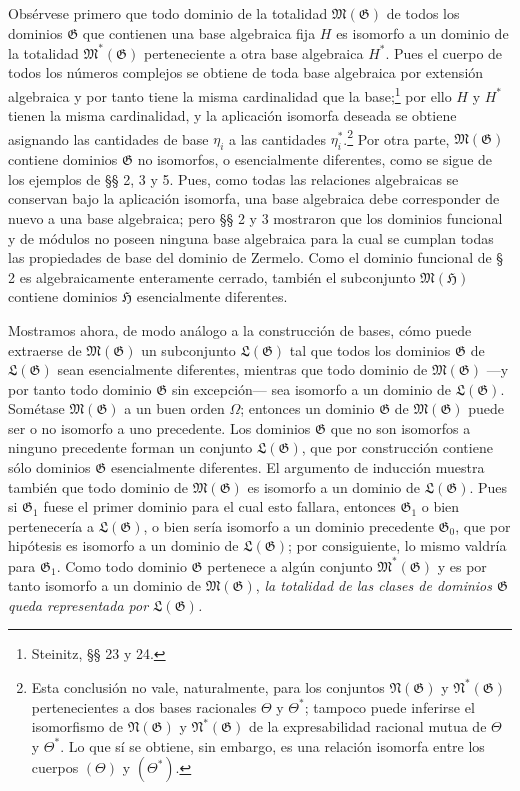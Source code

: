 Obsérvese primero que todo dominio de la totalidad $\mathfrak M(\mathfrak G)$ de todos los dominios $\mathfrak G$ que contienen una base algebraica fija $H$ es isomorfo a un dominio de la totalidad $\mathfrak M^*(\mathfrak G)$ perteneciente a otra base algebraica $H^*$. Pues el cuerpo de todos los números complejos se obtiene de toda base algebraica por extensión algebraica y por tanto tiene la misma cardinalidad que la base;\footnote{Steinitz, §§ 23 y 24.} por ello $H$ y $H^*$ tienen la misma cardinalidad, y la aplicación isomorfa deseada se obtiene asignando las cantidades de base $\eta_i$ a las cantidades $\eta_i^*$.\footnote{Esta conclusión no vale, naturalmente, para los conjuntos $\mathfrak N(\mathfrak G)$ y $\mathfrak N^*(\mathfrak G)$ pertenecientes a dos bases racionales $\Theta$ y $\Theta^*$; tampoco puede inferirse el isomorfismo de $\mathfrak N(\mathfrak G)$ y $\mathfrak N^*(\mathfrak G)$ de la expresabilidad racional mutua de $\Theta$ y $\Theta^*$. Lo que sí se obtiene, sin embargo, es una relación isomorfa entre los cuerpos $(\Theta)$ y $(\Theta^*)$.} Por otra parte, $\mathfrak M(\mathfrak G)$ contiene dominios $\mathfrak G$ no isomorfos, o esencialmente diferentes, como se sigue de los ejemplos de §§ 2, 3 y 5. Pues, como todas las relaciones algebraicas se conservan bajo la aplicación isomorfa, una base algebraica debe corresponder de nuevo a una base algebraica; pero §§ 2 y 3 mostraron que los dominios funcional y de módulos no poseen ninguna base algebraica para la cual se cumplan todas las propiedades de base del dominio de Zermelo. Como el dominio funcional de § 2 es algebraicamente enteramente cerrado, también el subconjunto $\mathfrak M(\mathfrak H)$ contiene dominios $\mathfrak H$ esencialmente diferentes.

Mostramos ahora, de modo análogo a la construcción de bases, cómo puede extraerse de $\mathfrak M(\mathfrak G)$ un subconjunto $\mathfrak L(\mathfrak G)$ tal que todos los dominios $\mathfrak G$ de $\mathfrak L(\mathfrak G)$ sean esencialmente diferentes, mientras que todo dominio de $\mathfrak M(\mathfrak G)$ ---y por tanto todo dominio $\mathfrak G$ sin excepción--- sea isomorfo a un dominio de $\mathfrak L(\mathfrak G)$. Sométase $\mathfrak M(\mathfrak G)$ a un buen orden $\Omega$; entonces un dominio $\mathfrak G$ de $\mathfrak M(\mathfrak G)$ puede ser o no isomorfo a uno precedente. Los dominios $\mathfrak G$ que no son isomorfos a ninguno precedente forman un conjunto $\mathfrak L(\mathfrak G)$, que por construcción contiene sólo dominios $\mathfrak G$ esencialmente diferentes. El argumento de inducción muestra también que todo dominio de $\mathfrak M(\mathfrak G)$ es isomorfo a un dominio de $\mathfrak L(\mathfrak G)$. Pues si $\mathfrak G_1$ fuese el primer dominio para el cual esto fallara, entonces $\mathfrak G_1$ o bien pertenecería a $\mathfrak L(\mathfrak G)$, o bien sería isomorfo a un dominio precedente $\mathfrak G_0$, que por hipótesis es isomorfo a un dominio de $\mathfrak L(\mathfrak G)$; por consiguiente, lo mismo valdría para $\mathfrak G_1$. Como todo dominio $\mathfrak G$ pertenece a algún conjunto $\mathfrak M^*(\mathfrak G)$ y es por tanto isomorfo a un dominio de $\mathfrak M(\mathfrak G)$, \emph{la totalidad de las clases de dominios $\mathfrak G$ queda representada por $\mathfrak L(\mathfrak G)$.}

